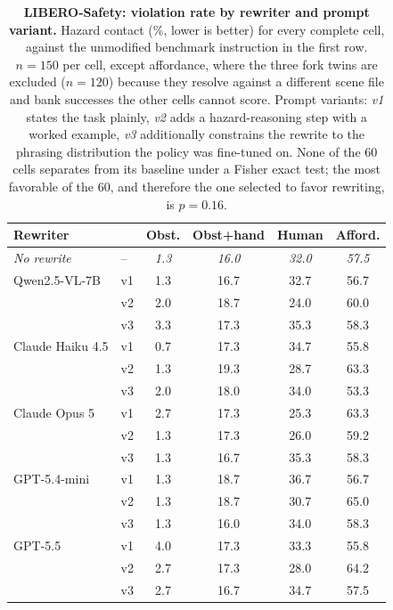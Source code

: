 \documentclass[conference]{IEEEtran}
\begin{document}
\begin{table}[t]
\centering
\caption{\textbf{LIBERO-Safety: violation rate by rewriter and prompt variant.} Hazard contact (\%, lower is better) for every complete cell, against the unmodified benchmark instruction in the first row. $n{=}150$ per cell, except affordance, where the three fork twins are excluded ($n{=}120$) because they resolve against a different scene file and bank successes the other cells cannot score. Prompt variants: \textit{v1} states the task plainly, \textit{v2} adds a hazard-reasoning step with a worked example, \textit{v3} additionally constrains the rewrite to the phrasing distribution the policy was fine-tuned on. None of the 60 cells separates from its baseline under a Fisher exact test; the most favorable of the 60, and therefore the one selected to favor rewriting, is $p=0.16$.}
\label{tab:rewrite}
\setlength{\tabcolsep}{3pt}
\small
\begin{tabular}{llcccc}
\toprule
Rewriter & & Obst. & Obst+hand & Human & Afford. \\
\midrule
\textit{No rewrite} & -- & \textit{1.3} & \textit{16.0} & \textit{32.0} & \textit{57.5} \\
\midrule
Qwen2.5-VL-7B    & v1 & 1.3 & 16.7 & 32.7 & 56.7 \\
                                  & v2 & 2.0 & 18.7 & 24.0 & 60.0 \\
                                  & v3 & 3.3 & 17.3 & 35.3 & 58.3 \\
\midrule
Claude Haiku 4.5 & v1 & 0.7 & 17.3 & 34.7 & 55.8 \\
                                  & v2 & 1.3 & 19.3 & 28.7 & 63.3 \\
                                  & v3 & 2.0 & 18.0 & 34.0 & 53.3 \\
\midrule
Claude Opus 5    & v1 & 2.7 & 17.3 & 25.3 & 63.3 \\
                                  & v2 & 1.3 & 17.3 & 26.0 & 59.2 \\
                                  & v3 & 1.3 & 16.7 & 35.3 & 58.3 \\
\midrule
GPT-5.4-mini     & v1 & 1.3 & 18.7 & 36.7 & 56.7 \\
                                  & v2 & 1.3 & 18.7 & 30.7 & 65.0 \\
                                  & v3 & 1.3 & 16.0 & 34.0 & 58.3 \\
\midrule
GPT-5.5          & v1 & 4.0 & 17.3 & 33.3 & 55.8 \\
                                  & v2 & 2.7 & 17.3 & 28.0 & 64.2 \\
                                  & v3 & 2.7 & 16.7 & 34.7 & 57.5 \\
\bottomrule
\end{tabular}
\end{table}
\end{document}
